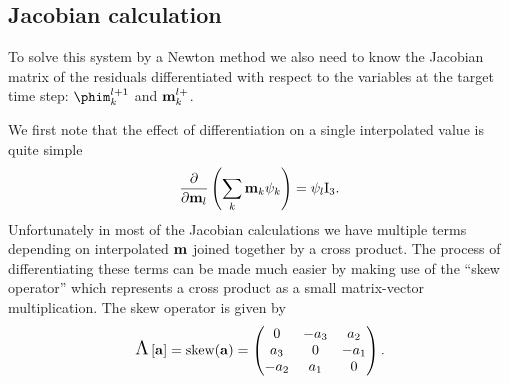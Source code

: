 \subsection{Jacobian calculation}
\label{sec:jacobian-calculation}

To solve this system by a Newton method we also need to know the Jacobian matrix of the residuals differentiated with respect to the variables at the target time step: $\phim_\ik^{\tl+1}$ and $\mathbf{m}_{k}^{l+}$.

We first note that the effect of differentiation on a single interpolated value is quite simple
\begin{equation}
  \frac{\partial }{\partial \mathbf{m}_l} \left( \sum_k \mathbf{m}_k {\psi_k} \right) = \psi_l \text{I}_3.
\end{equation}
Unfortunately in most of the Jacobian calculations we have multiple terms depending on interpolated $\mathbf{m}$ joined together by a cross product.
The process of differentiating these terms can be made much easier by making use of the ``skew operator'' which represents a cross product as a small matrix-vector multiplication.
The skew operator is given by
\begin{equation}
  \text{\Large{$\Lambda$}}\left[ {\mathbf{a}} \right] = \text{skew}({\mathbf{a}}) =
  \begin{pmatrix}
    0 & -a_3 & a_2 \\
    a_3 & 0 & -a_1 \\
    -a_2 & a_1 & 0
  \end{pmatrix}.
  \label{eqn:skew}
\end{equation}

